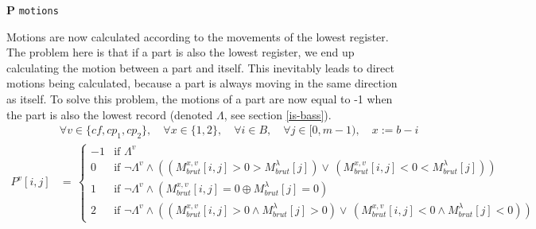 \vspace{.5cm}
\noindent \textbf{P} \hspace*{.2cm} \texttt{motions}

Motions are now calculated according to the movements of the lowest register. The problem here is that if a part is also the lowest register, we end up calculating the motion between a part and itself. This inevitably leads to direct motions being calculated, because a part is always moving in the same direction as itself. To solve this problem, the motions of a part are now equal to -1 when the part is also the lowest record (denoted $\Lambda$, see section \ref{is-bass}). 
\begin{equation}
\begin{aligned}
&\forall v \in \{cf, cp_1, cp_2\}, \quad \forall x \in \{1, 2\}, \quad \forall i \in B, \quad \forall j \in [0, m - 1),\quad x := b - i\\
    P^{v}[i,j]& = \,  
    \begin{cases}
        -1 & \text{if } \Lambda^{v} \\
        0 & \text{if } \neg \Lambda^{v} \land ((M_{brut}^{x, v}[i, j] > 0 > M^{\lambda}_{brut}[j]) \vee\, (M_{brut}^{x, v}[i, j] < 0 < M^{\lambda}_{brut}[j])) \\
        1 & \text{if } \neg \Lambda^{v} \land (M_{brut}^{x, v}[i, j] = 0  \oplus M^{\lambda}_{brut}[j]=0) \\
        2 & \text{if } \neg \Lambda^{v} \land ((M_{brut}^{x, v}[i, j] > 0 \land M^{\lambda}_{brut}[j] > 0) \vee\, (M_{brut}^{x, v}[i, j] < 0 \land M^{\lambda}_{brut}[j] <0))
    \end{cases}
\end{aligned}
\end{equation}
